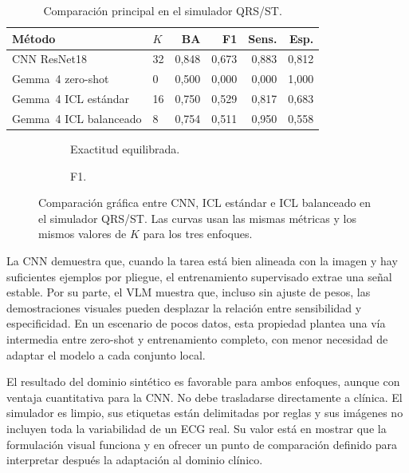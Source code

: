 \begin{table}[H]
  \centering
  \footnotesize
  \begin{tabularx}{\textwidth}{p{4.2cm}p{1.4cm}rrrr}
    \toprule
    Método & \(K\) & BA & F1 & Sens. & Esp. \\
    \midrule
    CNN ResNet18 & 32 & 0,848 & 0,673 & 0,883 & 0,812 \\
    Gemma~4 zero-shot & 0 & 0,500 & 0,000 & 0,000 & 1,000 \\
    Gemma~4 ICL estándar & 16 & 0,750 & 0,529 & 0,817 & 0,683 \\
    Gemma~4 ICL balanceado & 8 & 0,754 & 0,511 & 0,950 & 0,558 \\
    \bottomrule
  \end{tabularx}
  \caption{Comparación principal en el simulador QRS/ST.}
  \label{tab:comparacion_simulador}
\end{table}

\begin{figure}[H]
  \centering
  \begin{subfigure}{0.48\textwidth}
    \centering
    \caption{Exactitud equilibrada.}
  \end{subfigure}
  \hfill
  \begin{subfigure}{0.48\textwidth}
    \centering
    \caption{F1.}
  \end{subfigure}
  \caption{Comparación gráfica entre CNN, ICL estándar e ICL balanceado en el simulador QRS/ST. Las curvas usan las mismas métricas y los mismos valores de \(K\) para los tres enfoques.}
  \label{fig:comparacion_simulador_curvas}
\end{figure}

La CNN demuestra que, cuando la tarea está bien alineada con la imagen y hay suficientes ejemplos por pliegue, el entrenamiento supervisado extrae una señal estable. Por su parte, el VLM muestra que, incluso sin ajuste de pesos, las demostraciones visuales pueden desplazar la relación entre sensibilidad y especificidad. En un escenario de pocos datos, esta propiedad plantea una vía intermedia entre zero-shot y entrenamiento completo, con menor necesidad de adaptar el modelo a cada conjunto local.

El resultado del dominio sintético es favorable para ambos enfoques, aunque con ventaja cuantitativa para la CNN. No debe trasladarse directamente a clínica. El simulador es limpio, sus etiquetas están delimitadas por reglas y sus imágenes no incluyen toda la variabilidad de un ECG real. Su valor está en mostrar que la formulación visual funciona y en ofrecer un punto de comparación definido para interpretar después la adaptación al dominio clínico.


